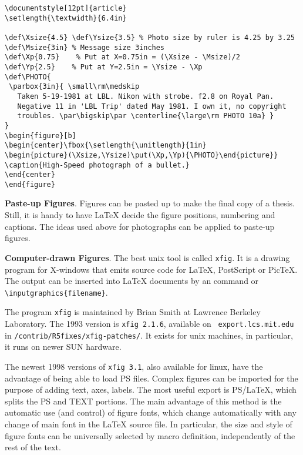 \footnotesize\begin{verbatim}
\documentstyle[12pt]{article}
\setlength{\textwidth}{6.4in}

\def\Xsize{4.5} \def\Ysize{3.5} % Photo size by ruler is 4.25 by 3.25
\def\Msize{3in} % Message size 3inches
\def\Xp{0.75}    % Put at X=0.75in = (\Xsize - \Msize)/2
\def\Yp{2.5}    % Put at Y=2.5in = \Ysize - \Xp
\def\PHOTO{
 \parbox{3in}{ \small\rm\medskip
   Taken 5-19-1981 at LBL. Nikon with strobe. f2.8 on Royal Pan.
   Negative 11 in 'LBL Trip' dated May 1981. I own it, no copyright
   troubles. \par\bigskip\par \centerline{\large\rm PHOTO 10a} }
}
\begin{figure}[b]
\begin{center}\fbox{\setlength{\unitlength}{1in}
\begin{picture}(\Xsize,\Ysize)\put(\Xp,\Yp){\PHOTO}\end{picture}}
\caption{High-Speed photograph of a bullet.}
\end{center}
\end{figure}

\end{verbatim}\normalsize
\clearpage

{\bf Paste-up Figures}. Figures can be pasted up to make the final copy
of a thesis. Still, it is handy to have \LaTeX{} decide the figure
positions, numbering and captions. The ideas used above for photographs
can be applied to paste-up figures.


{\bf Computer-drawn Figures}. The best unix tool is called {\tt xfig}.
It is a drawing program for X-windows that emits source code for
\LaTeX{}, PostScript or Pic\TeX{}. The output can be inserted into \LaTeX{}
documents by an \verb"" command or
\verb"\inputgraphics{filename}".

The program {\tt xfig} is maintained by Brian Smith at Lawrence Berkeley
Laboratory. The 1993 version is {\tt xfig 2.1.6}, available on {\tt
export.lcs.mit.edu} in {\tt /contrib/R5fixes/xfig-patches/}. It exists
for unix machines, in particular, it runs on newer SUN hardware.

The newest 1998 versions of {\tt xfig 3.1}, also available for linux, have
the advantage of being able to load PS files. Complex figures can be
imported for the purpose of adding text, axes, labels.  The most useful
export is PS/LaTeX, which splits the PS and TEXT portions. The main advantage
of this method is the automatic use (and control) of figure fonts, which
change automatically with any change of main font in the LaTeX source file.
In particular, the size and style of figure fonts can be universally selected
by macro definition, independently of the rest of the text.

